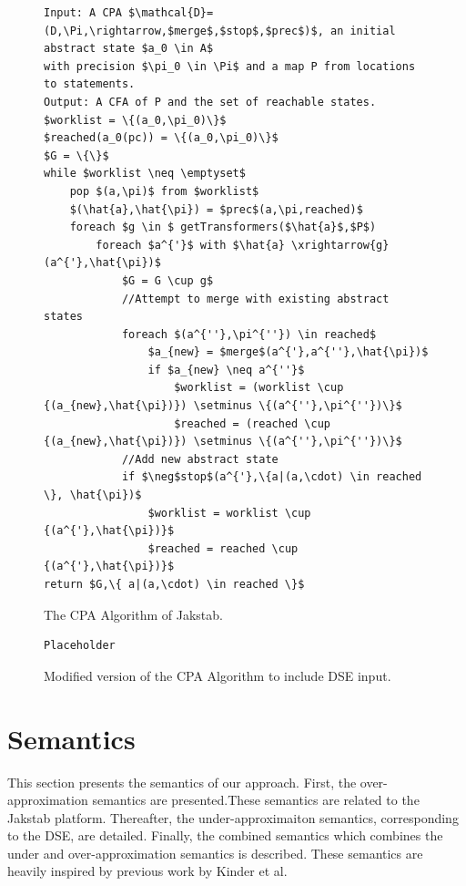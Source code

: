 \documentclass{kththesis}
\begin{document}
\begin{figure}[t]
    \centering
\begin{lstlisting}[style=algorithm]
Input: A CPA $\mathcal{D}=(D,\Pi,\rightarrow,$merge$,$stop$,$prec$)$, an initial abstract state $a_0 \in A$ 
with precision $\pi_0 \in \Pi$ and a map P from locations to statements.
Output: A CFA of P and the set of reachable states.
$worklist = \{(a_0,\pi_0)\}$
$reached(a_0(pc)) = \{(a_0,\pi_0)\}$
$G = \{\}$
while $worklist \neq \emptyset$
    pop $(a,\pi)$ from $worklist$
    $(\hat{a},\hat{\pi}) = $prec$(a,\pi,reached)$
    foreach $g \in $ getTransformers($\hat{a}$,$P$)
        foreach $a^{'}$ with $\hat{a} \xrightarrow{g} (a^{'},\hat{\pi})$
            $G = G \cup g$
            //Attempt to merge with existing abstract states
            foreach $(a^{''},\pi^{''}) \in reached$
                $a_{new} = $merge$(a^{'},a^{''},\hat{\pi})$
                if $a_{new} \neq a^{''}$
                    $worklist = (worklist \cup {(a_{new},\hat{\pi})}) \setminus \{(a^{''},\pi^{''})\}$
                    $reached = (reached \cup {(a_{new},\hat{\pi})}) \setminus \{(a^{''},\pi^{''})\}$
            //Add new abstract state
            if $\neg$stop$(a^{'},\{a|(a,\cdot) \in reached \}, \hat{\pi})$
                $worklist = worklist \cup {(a^{'},\hat{\pi})}$
                $reached = reached \cup {(a^{'},\hat{\pi})}$
return $G,\{ a|(a,\cdot) \in reached \}$
\end{lstlisting}
\caption[The CPA Algorithm of Jakstab.]{The CPA Algorithm of Jakstab.}
    \label{fig:CPAJakstab}
\end{figure}

\begin{figure}[t]
    \centering
\begin{lstlisting}[style=frame]
Placeholder
\end{lstlisting}
\caption[Modified version of the CPA Algorithm to include DSE input.]{Modified version of the CPA Algorithm to include DSE input.}
    \label{fig:CPAJakstab}
\end{figure}

\section{Semantics}
This section presents the semantics of our approach. First, the over-approximation semantics are presented.These semantics are related to the Jakstab platform. Thereafter, the under-approximaiton semantics, corresponding to the DSE, are detailed. Finally, the combined semantics which combines the under and over-approximation semantics is described. These semantics are heavily inspired by previous work by Kinder et al\cite{alternating}.
\end{document}
